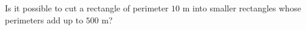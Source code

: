 Is it possible to cut a rectangle of perimeter $10$ m into smaller rectangles whose perimeters add up to $500$ m?
